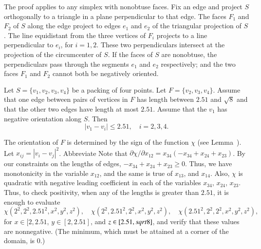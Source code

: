 \begin{tarskidata}
\begin{tarski}
\begin{proved}
The proof applies to any simplex with nonobtuse faces. 
Fix an edge and project $S$ orthogonally
to a triangle in a plane perpendicular to that edge. The faces
$F_1$ and $F_2$ of $S$ along the edge project to edges $e_1$ and
$e_2$ of the triangular projection of $S$. The line equidistant
from the three vertices of $F_i$ projects to a line perpendicular
to $e_i$, for $i=1,2$. These two perpendiculars intersect at the
projection of the circumcenter of $S$.  If the faces of $S$ are
nonobtuse, the perpendiculars pass through the segments $e_1$ and
$e_2$ respectively; and the two faces $F_1$ and $F_2$ cannot both
be negatively oriented.
\swallowed\end{proved}
\end{tarski}





\begin{tarski}

\begin{lemma}
Let $S=\{v_1,v_2,v_3,v_4\}$ be a packing of four points.
Let $F=\{v_2,v_3,v_4\}$.
Assume that one edge between
pairs of vertices in $F$
has length between $2.51$ and $\sqrt8$ and that
the other two edges have length at most $2.51$.  
Assume that the $v_1$ has negative orientation
along $S$. Then
   $$
   |v_1-v_i|\le 2.51, \quad i=2,3,4.
   $$
\end{lemma}

\begin{proved}  
The orientation of $F$ is determined by the sign of the function
$\chi$ (see Lemma~). 
Let $x_{ij}=|v_i-v_j|^2$.  Abbreviate
Note that $\partial\chi/\partial x_{12} = x_{34}
(-x_{34}+x_{24}+x_{23})$.  By our
constraints on the lengths of edges, 
$-x_{34}+x_{24}+x_{23}\ge0$. Thus, we have monotonicity in the variable $x_{12}$,
and the same is true of $x_{13}$, and $x_{14}$. Also, $\chi$ is
quadratic with negative leading coefficient in each of the
variables $x_{34}$, $x_{24}$, $x_{23}$. Thus, to check positivity, when any
of the lengths is greater than $2.51$, it is enough to evaluate
$$\chi(2^2,2^2,2.51^2,x^2,y^2,z^2), \quad
\chi(2^2,2.51^2,2^2,x^2,y^2,z^2),  \quad
\chi(2.51^2,2^2,2^2,x^2,y^2,z^2),$$ for $x\in[2,2.51$,
$y\in[2,2.51]$, and $z\in[2.51,sqrt8]$, and verify that these
values are nonnegative. (The minimum, which must be attained at a
corner of the domain, is  $0$.)
\swallowed\end{proved}
\end{tarski}





\end{tarskidata}
